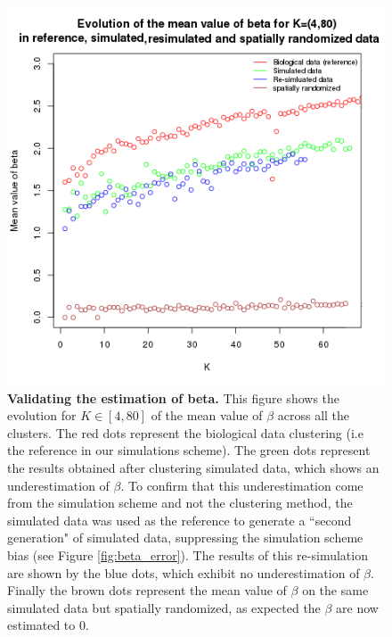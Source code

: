 	\begin{figure}[H]
\centerline{\includegraphics[width=0.6\linewidth]{gfx/chapter5/beta_valid.png}}
\caption{{\bf Validating the estimation of beta.} This figure shows the evolution for $K \in [4,80]$ of the mean value of $\beta$ across all the clusters. The red dots represent the biological data clustering (i.e the reference in our simulations scheme). The green dots represent the results obtained after clustering simulated data, which shows an underestimation of $\beta$. To confirm that this underestimation come from the simulation scheme and not the clustering method, the simulated data was used as the reference to generate a ``second generation" of simulated data, suppressing the simulation scheme bias (see Figure \ref{fig:beta_error}). The results of this re-simulation are shown by the blue dots, which exhibit no underestimation of $\beta$. Finally the brown dots represent the mean value of $\beta$ on the same simulated data but spatially randomized, as expected the $\beta$ are now estimated to $0$.}
\label{fig:beta_validation}
	\end{figure}
	
